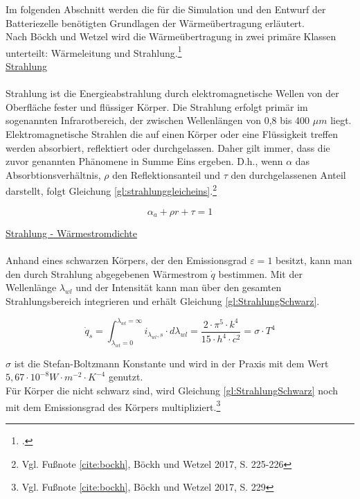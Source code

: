 Im folgenden Abschnitt werden die für die Simulation und den Entwurf der Batteriezelle benötigten Grundlagen der Wärmeübertragung erläutert. \\
Nach Böckh und Wetzel wird die Wärmeübertragung in zwei primäre Klassen unterteilt: Wärmeleitung und Strahlung.\footcite[Vgl.\label{cite:bockh}][S. 4]{Bockh.2017} \\

\underline{Strahlung}\\
\\
Strahlung ist die Energieabstrahlung durch elektromagnetische Wellen von der Oberfläche fester und flüssiger Körper. Die Strahlung erfolgt primär im sogenannten Infrarotbereich, der zwischen Wellenlängen von 0,8 bis 400 $\mu m$ liegt.\\
Elektromagnetische Strahlen die auf einen Körper oder eine Flüssigkeit treffen werden absorbiert, reflektiert oder durchgelassen. Daher gilt immer, dass die zuvor genannten Phänomene in Summe Eins ergeben. D.h., wenn $\alpha$ das Absorbtionsverhältnis, $\rho$ den Reflektionsanteil und $\tau$ den durchgelassenen Anteil darstellt, folgt Gleichung \ref{gl:strahlunggleicheins}.\footnote{Vgl. Fußnote \ref{cite:bockh}, Böckh und Wetzel 2017, S. 225-226}

\begin{equation}
	\alpha_{a} + \rho{r} + \tau = 1 \label{gl:strahlunggleicheins}
\end{equation}

\underline{Strahlung - Wärmestromdichte}\\
\\

Anhand eines schwarzen Körpers, der den Emissionsgrad $\varepsilon = 1$ besitzt, kann man den durch Strahlung abgegebenen Wärmestrom $\dot{q}$ bestimmen. Mit der Wellenlänge $\lambda_{wl}$ und der Intensität kann man über den gesamten Strahlungsbereich integrieren und erhält Gleichung \ref{gl:StrahlungSchwarz}.

\begin{equation}
	\dot{q}_{s} = \int_{\lambda_{wl} = 0}^{\lambda_{wl} = \infty} i_{\lambda_{wl},s} \cdot d\lambda_{wl} = \frac{2 \cdot \pi^{5} \cdot k^{4}}{15 \cdot h^{4} \cdot c^{2}} = \sigma \cdot T^{4} \label{gl:StrahlungSchwarz}
\end{equation}

$\sigma$ ist die Stefan-Boltzmann Konstante und wird in der Praxis mit dem Wert\newline $5,67 \cdot 10^{-8} W \cdot m^{-2} \cdot K^{-4}$ genutzt.\\
Für Körper die nicht schwarz sind, wird Gleichung \ref{gl:StrahlungSchwarz} noch mit dem Emissionsgrad des Körpers multipliziert.\footnote{Vgl. Fußnote \ref{cite:bockh}, Böckh und Wetzel 2017, S. 229}\\

